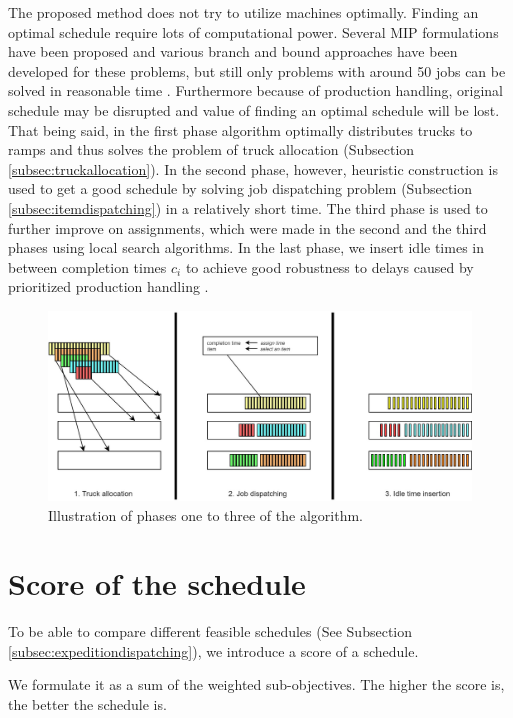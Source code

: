 \documentclass{ctuthesis}
\begin{document}
The proposed method does not try to utilize machines optimally. Finding an optimal schedule require lots of computational power. Several MIP formulations have been proposed and various branch and bound approaches have been developed for these problems, but still only problems with around 50 jobs can be solved in reasonable time \cite{pinedo}. Furthermore because of production handling, original schedule may be disrupted and value of finding an optimal schedule will be lost. That being said, in the first phase algorithm optimally distributes trucks to ramps and thus solves the problem of truck allocation (Subsection \ref{subsec:truckallocation}). In the second phase, however, heuristic construction is used to get a good schedule by solving job dispatching problem (Subsection \ref{subsec:itemdispatching}) in a relatively short time. The third phase is used to further improve on assignments, which were made in the second and the third phases using local search algorithms. In the last phase, we insert idle times in between completion times $c_i$ to achieve good robustness to delays caused by prioritized production handling \cite{pinedo}. 

\begin{figure}[H]
\includegraphics[width=1.0\linewidth]{algo.jpg}
\caption{Illustration of phases one to three of the algorithm.}
\end{figure}

\section{Score of the schedule}

To be able to compare different feasible schedules (See Subsection \ref{subsec:expeditiondispatching}), we introduce a score of a schedule. 

We formulate it as a sum of the weighted sub-objectives. The higher the score is, the better the schedule is.
\end{document}
